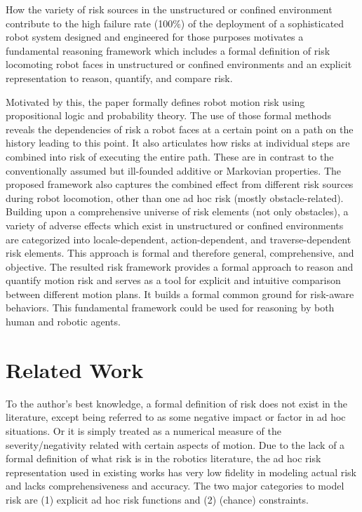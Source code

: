 \documentclass[letterpaper]{article} %
\begin{document}
How the variety of risk sources in the unstructured or confined environment contribute to the high failure rate (100\%) of the deployment of a sophisticated robot system designed and engineered for those purposes motivates a fundamental reasoning framework which includes a formal definition of risk locomoting robot faces in unstructured or confined environments and an explicit representation to reason, quantify, and compare risk.

Motivated by this, the paper formally defines robot motion risk using propositional logic and probability theory. The use of those formal methods reveals the dependencies of risk a robot faces at a certain point on a path on the history leading to this point. It also articulates how risks at individual steps are combined into risk of executing the entire path. These are in contrast to the conventionally assumed but ill-founded additive or Markovian properties. The proposed framework also captures the combined effect from different risk sources during robot locomotion, other than one ad hoc risk (mostly obstacle-related). Building upon a comprehensive universe of risk elements (not only obstacles), a variety of adverse effects which exist in unstructured or confined environments are categorized into locale-dependent, action-dependent, and traverse-dependent risk elements. This approach is formal and therefore general, comprehensive, and objective. The resulted risk framework provides a formal approach to reason and quantify motion risk and serves as a tool for explicit and intuitive comparison between different motion plans. It builds a formal common ground for risk-aware behaviors. This fundamental framework could be used for reasoning by both human and robotic agents.

\section{Related Work}
\label{sec::related_work}
To the author's best knowledge, a formal definition of risk does not exist in the literature, except being referred to as some negative impact or factor in ad hoc situations. Or it is simply treated as a numerical measure of the severity/negativity related with certain aspects of motion. Due to the lack of a formal definition of what risk is in the robotics literature, the ad hoc risk representation used in existing works has very low fidelity in modeling actual risk and lacks comprehensiveness and accuracy. The two major categories to model risk are (1) explicit ad hoc risk functions and (2) (chance) constraints.
\end{document}
